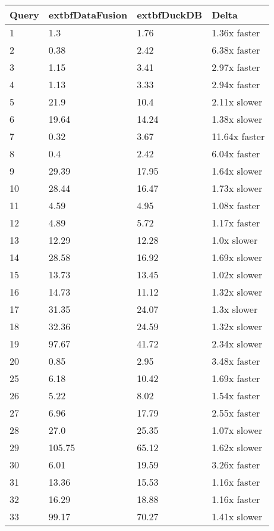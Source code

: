 \begin{table}[h]
\centering
\begin{tabular}{|l|l|l|l|}
\hline
Query & 	extbf{DataFusion} & 	extbf{DuckDB} & Delta \\
\hline
1 & 1.3 & 1.76 & 1.36x faster \\
\hline
2 & 0.38 & 2.42 & 6.38x faster \\
\hline
3 & 1.15 & 3.41 & 2.97x faster \\
\hline
4 & 1.13 & 3.33 & 2.94x faster \\
\hline
5 & 21.9 & 10.4 & 2.11x slower \\
\hline
6 & 19.64 & 14.24 & 1.38x slower \\
\hline
7 & 0.32 & 3.67 & 11.64x faster \\
\hline
8 & 0.4 & 2.42 & 6.04x faster \\
\hline
9 & 29.39 & 17.95 & 1.64x slower \\
\hline
10 & 28.44 & 16.47 & 1.73x slower \\
\hline
11 & 4.59 & 4.95 & 1.08x faster \\
\hline
12 & 4.89 & 5.72 & 1.17x faster \\
\hline
13 & 12.29 & 12.28 & 1.0x slower \\
\hline
14 & 28.58 & 16.92 & 1.69x slower \\
\hline
15 & 13.73 & 13.45 & 1.02x slower \\
\hline
16 & 14.73 & 11.12 & 1.32x slower \\
\hline
17 & 31.35 & 24.07 & 1.3x slower \\
\hline
18 & 32.36 & 24.59 & 1.32x slower \\
\hline
19 & 97.67 & 41.72 & 2.34x slower \\
\hline
20 & 0.85 & 2.95 & 3.48x faster \\
\hline
25 & 6.18 & 10.42 & 1.69x faster \\
\hline
26 & 5.22 & 8.02 & 1.54x faster \\
\hline
27 & 6.96 & 17.79 & 2.55x faster \\
\hline
28 & 27.0 & 25.35 & 1.07x slower \\
\hline
29 & 105.75 & 65.12 & 1.62x slower \\
\hline
30 & 6.01 & 19.59 & 3.26x faster \\
\hline
31 & 13.36 & 15.53 & 1.16x faster \\
\hline
32 & 16.29 & 18.88 & 1.16x faster \\
\hline
33 & 99.17 & 70.27 & 1.41x slower \\

\end{tabular}
\end{table}

